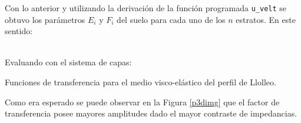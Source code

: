 
Con lo anterior y utilizando la derivación de la función programada \texttt{u\_velt} se obtuvo los parámetros $E_i$ y $F_i$ del suelo para cada uno de los $n$ estratos. En este sentido:

 \\

Evaluando con el sistema de capas:

\begin{images}[\label{p3dimg}]{Funciones de transferencia para el medio visco-elástico del perfil de Llolleo.}
\end{images}

Como era esperado se puede observar en la Figura \ref{p3dimg} que el factor de transferencia posee mayores amplitudes dado el mayor contraste de impedancias.